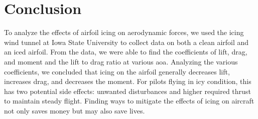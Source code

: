 \chapter{Conclusion} \label{cp:conclusion}

To analyze the effects of airfoil icing on aerodynamic forces, we used the icing wind tunnel at Iowa State University to collect data on both a clean airfoil and an iced airfoil. From the data, we were able to find the coefficients of lift, drag, and moment and the lift to drag ratio at various \acrshort{aoa}. Analyzing the various coefficients, we concluded that icing on the airfoil generally decreases lift, increases drag, and decreases the moment. For pilots flying in icy condition, this has two potential side effects: unwanted disturbances and higher required thrust to maintain steady flight. Finding ways to mitigate the effects of icing on aircraft not only saves money but may also save lives.